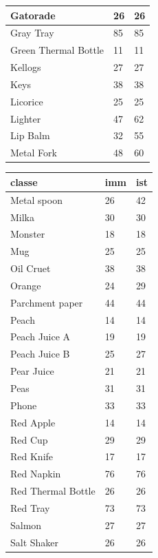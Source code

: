 \documentclass[../main.tex]{subfiles}
\begin{document}
\begin{table}[h!]
\begin{tabular}{|l|l|l|}
        Gatorade & 26 & 26 \\ \hline
        Gray Tray & 85 & 85 \\ \hline
        Green Thermal Bottle & 11 & 11 \\ \hline
        Kellogs & 27 & 27 \\ \hline
        Keys & 38 & 38 \\ \hline
        Licorice & 25 & 25 \\ \hline
        Lighter & 47 & 62 \\ \hline
        Lip Balm & 32 & 55 \\ \hline
        Metal Fork & 48 & 60 \\ \hline
    \end{tabular}
    \quad %
    \begin{tabular}{|l|l|l|} %
        \hline \textbf{classe} & \textbf{imm} & \textbf{ist} \\ \hline
        Metal spoon & 26 & 42 \\ \hline
        Milka & 30 & 30 \\ \hline
        Monster & 18 & 18 \\ \hline
        Mug & 25 & 25 \\ \hline
        Oil Cruet & 38 & 38 \\ \hline
        Orange & 24 & 29 \\ \hline
        Parchment paper & 44 & 44 \\ \hline
        Peach & 14 & 14 \\ \hline
        Peach Juice A & 19 & 19 \\ \hline
        Peach Juice B & 25 & 27 \\ \hline
        Pear Juice & 21 & 21 \\ \hline
        Peas & 31 & 31 \\ \hline
        Phone & 33 & 33 \\ \hline
        Red Apple & 14 & 14 \\ \hline
        Red Cup & 29 & 29 \\ \hline
        Red Knife & 17 & 17 \\ \hline
        Red Napkin & 76 & 76 \\ \hline
        Red Thermal Bottle & 26 & 26 \\ \hline
        Red Tray & 73 & 73 \\ \hline
        Salmon & 27 & 27 \\ \hline
        Salt Shaker & 26 & 26 \\ \hline

\end{tabular}
\end{table}
\end{document}
